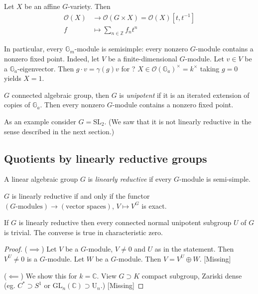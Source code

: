 Let $X$ be an affine $G$-variety. Then
\begin{align*}
\mathcal{O}(X) &\longrightarrow \mathcal{O}(G\times X)
=\mathcal{O}(X)[t,t^{-1}] \\
f &\longmapsto \sum_{n \in \mathbb{Z}}f_n t^n
\end{align*}

In particular, every $\mathbb{G}_m$-module is semisimple: every nonzero
$G$-module contains a nonzero fixed point. Indeed, let $V$ be a
finite-dimensional $G$-module. Let $v \in V$ be a $\mathbb{G}_a$-eigenvector.
Then $g\cdot v=\gamma(g)v$ for ? $X \in
\mathcal{O}(\mathbb{G}_a)^{\times}=k^{\times}$ taking $g=0$ yields $X=1$.

$G$ connected algebraic group, then $G$ is {\it unipotent} if it is an iterated
extension of copies of $\mathbb{G}_a$. Then every nonzero $G$-module contains a
nonzero fixed point.

As an example consider $G=\text{SL}_2$. (We saw that it is not linearly
reductive in the sense described in the next section.)

\subsection*{Quotients by linearly reductive groups}
\label{subsection-quotients-by-linearly-reductive-groups}

\begin{definition}
\label{definition-linearly-reductive-group}
A linear algebraic group $G$ is {\it linearly reductive} if every $G$-module is
semi-simple.
\end{definition}

\begin{exercise}
\label{exercise-linearly-reductive-characterization}
$G$ is linearly reductive if and only if the functor 
$(\text{$G$-modules})\to(\text{vector spaces})$, $V \mapsto V^G$ is exact.
\end{exercise}

\begin{theorem}
\label{theorem-linearly-reductive-normal-unipotent-connected-subgroups-are-
trivial}
 If $G$ is linearly reductive then every connected normal unipotent subgroup $U$ 
of $G$ is trivial. The converse is true in characteristic zero.
\end{theorem}

\begin{proof}
($\implies$) Let $V$ be a $G$-module, $V\neq 0$ and $U$ as in the statement.
Then $V^U\neq 0$ is a $G$-module. Let $W$ be a $G$-module. 
Then $V=V^U \oplus W$. [Missing]

($\impliedby$) We show this for $k= \mathbb{C}$. View $G \supset K$ compact
subgroup, Zariski dense (eg. $C^* \supset S^1$ or 
$\text{GL}_n(\mathbb{C})\supset \text{U}_n$.) [Missing]
\end{proof}

